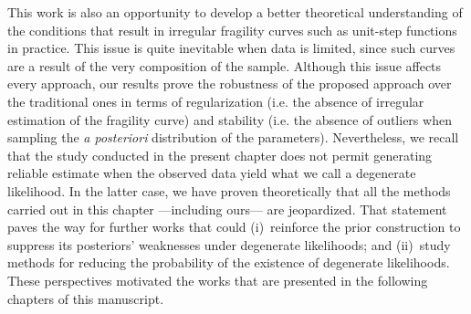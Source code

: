 This work is also an opportunity to develop a better theoretical understanding of the conditions that result in irregular fragility curves such as  unit-step functions in practice. This issue is quite inevitable when data is limited, since such curves are a result of the very composition of the sample. Although this issue affects every approach, 
our results prove the robustness of the proposed approach over the traditional ones in terms of regularization (i.e. the absence of irregular estimation of the fragility curve) and stability (i.e. the absence of outliers when sampling the \emph{a posteriori} distribution of the parameters).  %
Nevertheless, we recall that the study conducted in the present chapter does not permit generating reliable estimate
when the
observed data yield what we call a degenerate likelihood. In the latter case, we have proven theoretically that all the methods carried out in this chapter ---including ours--- are jeopardized.
That statement paves the way for further works that could (i)~reinforce the prior construction to suppress its posteriors' weaknesses under degenerate likelihoods; and (ii)~study methods for reducing the probability of the existence of degenerate likelihoods. These perspectives motivated the works that are presented in the following chapters of this manuscript.



